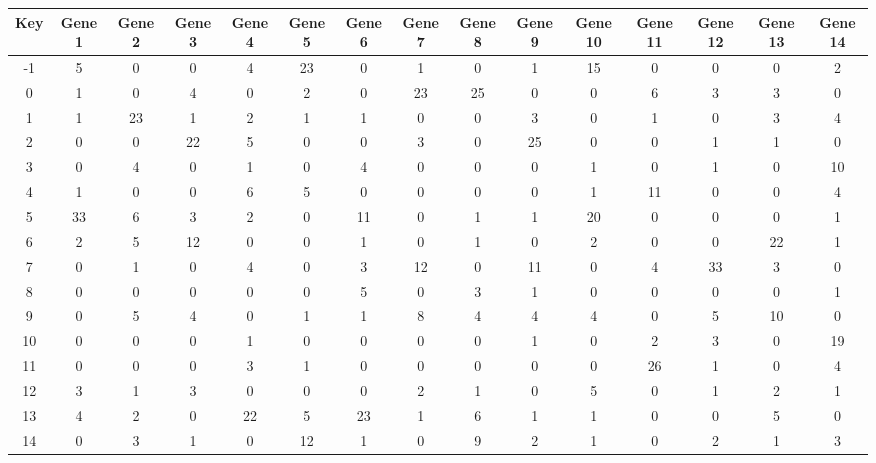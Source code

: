\begin{tabular}{|c|c|c|c|c|c|c|c|c|c|c|c|c|c|c|}
\hline
Key & Gene 1 & Gene 2 & Gene 3 & Gene 4 & Gene 5 & Gene 6 & Gene 7 & Gene 8 & Gene 9 & Gene 10 & Gene 11 & Gene 12 & Gene 13 & Gene 14 \\
\hline
-1 & 5 & 0 & 0 & 4 & 23 & 0 & 1 & 0 & 1 & 15 & 0 & 0 & 0 & 2 \\
0 & 1 & 0 & 4 & 0 & 2 & 0 & 23 & 25 & 0 & 0 & 6 & 3 & 3 & 0 \\
1 & 1 & 23 & 1 & 2 & 1 & 1 & 0 & 0 & 3 & 0 & 1 & 0 & 3 & 4 \\
2 & 0 & 0 & 22 & 5 & 0 & 0 & 3 & 0 & 25 & 0 & 0 & 1 & 1 & 0 \\
3 & 0 & 4 & 0 & 1 & 0 & 4 & 0 & 0 & 0 & 1 & 0 & 1 & 0 & 10 \\
4 & 1 & 0 & 0 & 6 & 5 & 0 & 0 & 0 & 0 & 1 & 11 & 0 & 0 & 4 \\
5 & 33 & 6 & 3 & 2 & 0 & 11 & 0 & 1 & 1 & 20 & 0 & 0 & 0 & 1 \\
6 & 2 & 5 & 12 & 0 & 0 & 1 & 0 & 1 & 0 & 2 & 0 & 0 & 22 & 1 \\
7 & 0 & 1 & 0 & 4 & 0 & 3 & 12 & 0 & 11 & 0 & 4 & 33 & 3 & 0 \\
8 & 0 & 0 & 0 & 0 & 0 & 5 & 0 & 3 & 1 & 0 & 0 & 0 & 0 & 1 \\
9 & 0 & 5 & 4 & 0 & 1 & 1 & 8 & 4 & 4 & 4 & 0 & 5 & 10 & 0 \\
10 & 0 & 0 & 0 & 1 & 0 & 0 & 0 & 0 & 1 & 0 & 2 & 3 & 0 & 19 \\
11 & 0 & 0 & 0 & 3 & 1 & 0 & 0 & 0 & 0 & 0 & 26 & 1 & 0 & 4 \\
12 & 3 & 1 & 3 & 0 & 0 & 0 & 2 & 1 & 0 & 5 & 0 & 1 & 2 & 1 \\
13 & 4 & 2 & 0 & 22 & 5 & 23 & 1 & 6 & 1 & 1 & 0 & 0 & 5 & 0 \\
14 & 0 & 3 & 1 & 0 & 12 & 1 & 0 & 9 & 2 & 1 & 0 & 2 & 1 & 3 \\
\hline
\end{tabular}
